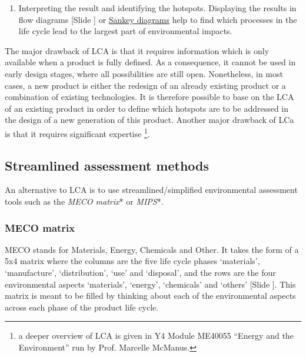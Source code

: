 \documentclass{article}
\newcounter{slide}
\begin{document}
\begin{enumerate}
	\item Interpreting the result and identifying the hotspots. Displaying the results in flow diagrams {\color{blue}[Slide ]} or \href{https://en.wikipedia.org/wiki/Sankey_diagram}{Sankey diagrams} help to find which processes in the life cycle lead to the largest part of environmental impacts. 
\end{enumerate}

The major drawback of LCA is that it requires information which is only available when a product is fully defined. As a consequence, it cannot be used in early design stages, where all possibilities are still open. Nonetheless, in most cases, a new product is either the redesign of an already existing product or a combination of existing technologies. It is therefore possible to base on the LCA of an existing product in order to define which hotspots are to be addressed in the design of a new generation of this product. Another major drawback of LCa is that it requires significant expertise \footnote{a deeper overview of LCA is given in Y4 Module ME40055 ``Energy and the Environment'' run by Prof. Marcelle McManus.}.

\subsection{Streamlined assessment methods}
\label{sec:streamlined}
An alternative to LCA is to use streamlined/simplified environmental assessment tools such as the \emph{MECO matrix}* or \emph{MIPS}*. 

\subsubsection{MECO matrix}
\label{sec:meco}

MECO stands for Materials, Energy, Chemicals and Other. It takes the form of a 5x4 matrix where the columns are the five life cycle phases `materials', `manufacture', `distribution', `use' and `disposal', and the rows are the four environmental aspects `materials',  `energy', `chemicals' and `others' {\color{blue}[Slide ]}. This matrix is meant to be filled by thinking about each of the environmental aspects across each phase of the product life cycle.
\end{document}
